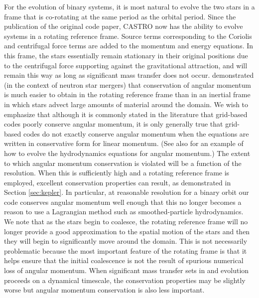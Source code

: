 \documentclass{emulateapj}
\begin{document}
For the evolution of binary systems, it is most natural to evolve the
two stars in a frame that is co-rotating at the same period as the
orbital period. Since the publication of the original code paper, CASTRO 
now has the ability to evolve systems in a rotating reference frame. 
Source terms corresponding to the Coriolis and centrifugal 
force terms are added to the momentum and energy equations. In this frame, 
the stars essentially remain stationary in their original positions due to the
centrifugal force supporting against the gravitational attraction, and
will remain this way as long as significant mass transfer does not
occur. \cite{swc:2000} demonstrated (in the context of neutron star
mergers) that conservation of angular momentum is much easier to
obtain in the rotating reference frame than in an inertial frame in
which stars advect large amounts of material around the domain. We
wish to emphasize that although it is commonly stated in the
literature that grid-based codes poorly conserve angular momentum,
it is only generally true that grid-based codes do not exactly conserve 
angular momentum when the equations are written in conservative form
for linear momentum. (See also \cite{motl:2002} for an example of how 
to evolve the hydrodynamics equations for angular momentum.) 
The extent to which angular momentum conservation is violated
will be a function of the resolution. When this is sufficiently high
and a rotating reference frame is employed, excellent conservation
properties can result, as demonstrated in Section \ref{sec:kepler}. 
In particular, at reasonable resolution for a binary orbit our code 
conserves angular momentum well enough that this no longer becomes 
a reason to use a Lagrangian method such as smoothed-particle hydrodynamics.
We note that as the stars begin to coalesce, the rotating reference frame
will no longer provide a good approximation to the spatial motion of
the stars and then they will begin to significantly move around the
domain. This is not necessarily problematic because the most important
feature of the rotating frame is that it helps ensure that the initial
coalescence is not the result of spurious numerical loss of angular
momentum. When significant mass transfer sets in and evolution
proceeds on a dynamical timescale, the conservation properties may be
slightly worse but angular momentum conservation is also less
important.
\end{document}
